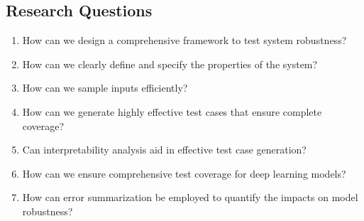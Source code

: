 \subsection{Research Questions}

\begin{enumerate}
  \item How can we design a comprehensive framework to test system robustness?
    \item How can we clearly define and specify the properties of the system?    
    \item How can we sample inputs efficiently?
    \item How can we generate highly effective test cases that ensure complete coverage?                                                                                                                                                     
    \item Can interpretability analysis aid in effective test case generation?
    \item How can we ensure comprehensive test coverage for deep learning models?
    \item How can error summarization be employed to quantify the impacts on model robustness?
      
        

       
    
    
 
        
        

       
    
  

\end{enumerate}


